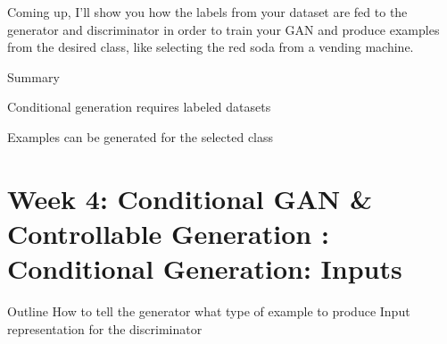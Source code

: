 \documentclass[11pt, onecolumn]{article}
\begin{document}
Coming up, I'll show you how the labels from your dataset are fed to the generator and discriminator in order to train your GAN and produce examples from the desired class, like selecting the red soda from a vending machine. 

Summary
\item Conditional generation requires labeled datasets
\item Examples can be generated for the selected class


\section{Week 4: Conditional GAN \& Controllable Generation : Conditional Generation: Inputs}

Outline
How to tell the generator what type of example to produce
Input representation for the discriminator
\end{document}
